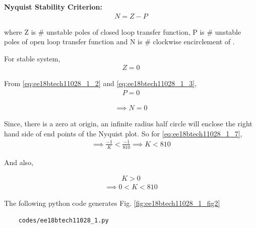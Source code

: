 \begin{enumerate}[label=\thesection.\arabic*.,ref=\thesection.\theenumi]
\textbf{Nyquist Stability Criterion:}
\begin{align}
    N = Z - P
\end{align}

where Z is \# unstable poles of closed loop transfer function, P is \# unstable poles of open loop transfer function
and N is \# clockwise encirclement of .

For stable system, 
\begin{align}
    Z = 0
\end{align}

From \eqref{eq:ee18btech11028_1_2} and \eqref{eq:ee18btech11028_1_3},
\begin{align}
    P = 0
\end{align}

\begin{align}
    \implies N = 0
    \label{eq:ee18btech11028_1_7}
\end{align}




Since, there is a zero at origin, an infinite radius half circle will enclose the right hand side of end points of the Nyquist plot.
So for \eqref{eq:ee18btech11028_1_7},
\begin{align}
    \implies \frac{-1}{K} < \frac{-1}{810}
    \implies K < 810
\end{align}

And also,

\begin{align}
    K > 0
\end{align}
\begin{align}
    \implies 0 < K < 810     
\end{align}


The following python code generates  Fig. \ref{fig:ee18btech11028_1_fig2}
\begin{lstlisting}
    codes/ee18btech11028_1.py
\end{lstlisting}
\end{enumerate}